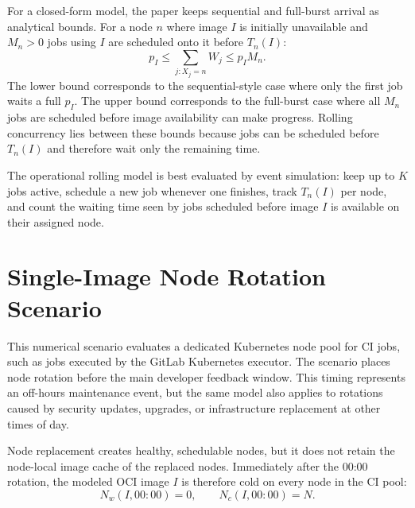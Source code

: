 \documentclass[11pt,a4paper]{article}
\begin{document}
For a closed-form model, the paper keeps sequential and full-burst arrival as analytical bounds. For a node \(n\) where image \(I\) is initially unavailable and \(M_n>0\) jobs using \(I\) are scheduled onto it before \(T_n(I)\):
\begin{equation}
  p_I
  \le
  \sum_{j:X_j=n} W_j
  \le
  p_I M_n.
\end{equation}
The lower bound corresponds to the sequential-style case where only the first job waits a full \(p_I\). The upper bound corresponds to the full-burst case where all \(M_n\) jobs are scheduled before image availability can make progress. Rolling concurrency lies between these bounds because jobs can be scheduled before \(T_n(I)\) and therefore wait only the remaining time.

The operational rolling model is best evaluated by event simulation: keep up to \(K\) jobs active, schedule a new job whenever one finishes, track \(T_n(I)\) per node, and count the waiting time seen by jobs scheduled before image \(I\) is available on their assigned node.



\section{Single-Image Node Rotation Scenario}\label{sec:primary-scenario}

This numerical scenario evaluates a dedicated Kubernetes node pool for CI jobs, such as jobs executed by the GitLab Kubernetes executor. The scenario places node rotation before the main developer feedback window. This timing represents an off-hours maintenance event, but the same model also applies to rotations caused by security updates, upgrades, or infrastructure replacement at other times of day.

Node replacement creates healthy, schedulable nodes, but it does not retain the node-local image cache of the replaced nodes. Immediately after the 00:00 rotation, the modeled OCI image \(I\) is therefore cold on every node in the CI pool:
\[
N_w(I,00{:}00)=0,\qquad N_c(I,00{:}00)=N.
\]
\end{document}
